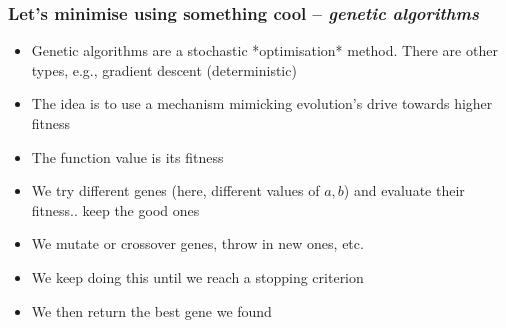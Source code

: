 \documentclass[aspectratio=169]{beamer}\usepackage[]{graphicx}\usepackage[]{xcolor}
\begin{document}
\begin{frame}\frametitle{Let's minimise using something cool -- \emph{genetic algorithms}}


\begin{itemize}
\item Genetic algorithms are a stochastic *optimisation* method. There are other types, e.g., gradient descent (deterministic)
\item The idea is to use a mechanism mimicking evolution's drive towards higher fitness
\item The function value is its fitness
\item We try different genes (here, different values of $a,b$) and evaluate their fitness.. keep the good ones
\item We mutate or crossover genes, throw in new ones, etc.
\item We keep doing this until we reach a stopping criterion
\item We then return the best gene we found
\end{itemize}
\end{frame}
\end{document}
